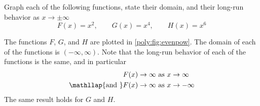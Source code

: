 \begin{pccexample}\label{poly:ex:evenpow}%
Graph each of the following functions, state their domain, and their 
long-run behavior as $x\rightarrow\pm\infty$
\[
    F(x)=x^2, \qquad G(x)=x^4, \qquad H(x)=x^6
\]
\begin{pccsolution}
 The functions $F$, $G$, and $H$ are plotted in \cref{poly:fig:evenpow}. The domain
 of each of the functions is $(-\infty,\infty)$. Note that the long-run behavior 
 of each of the functions is the same, and in particular
\begin{align*}
    F(x)\rightarrow\infty & \text{ as } x\rightarrow\infty\\
    \mathllap{\text{and }}   F(x)\rightarrow\infty & \text{ as } x\rightarrow-\infty
\end{align*}
The same result holds for $G$ and $H$.
\end{pccsolution}
\end{pccexample}

